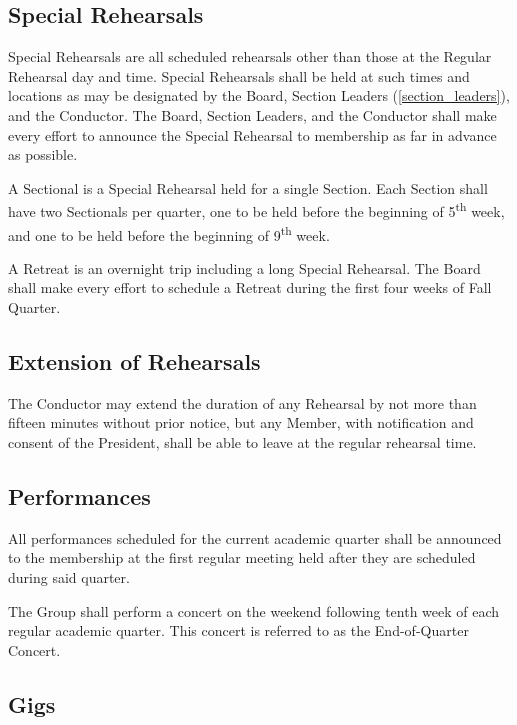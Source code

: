 \documentclass{article}
\begin{document}
\subsection{Special Rehearsals}

Special Rehearsals are all scheduled rehearsals other than those at the Regular
Rehearsal day and time. Special Rehearsals shall be held at such times and
locations as may be designated by the Board, Section Leaders (\ref{section_leaders}),
and the Conductor. The Board, Section Leaders, and the Conductor shall make
every effort to announce the Special Rehearsal to membership as far in advance
as possible.

A Sectional is a Special Rehearsal held for a single Section. Each Section shall
have two Sectionals per quarter, one to be held before the beginning of 5\textsuperscript{th}
week, and one to be held before the beginning of 9\textsuperscript{th} week.

A Retreat is an overnight trip including a long Special Rehearsal. The Board
shall make every effort to schedule a Retreat during the first four weeks of
Fall Quarter.

\subsection{Extension of Rehearsals}

The Conductor may extend the duration of any Rehearsal by not more
than fifteen minutes without prior notice, but any Member, with notification
and consent of the President, shall be able to leave at the regular
rehearsal time.

\subsection{Performances}

All performances scheduled for the current academic quarter shall
be announced to the membership at the first regular meeting held after
they are scheduled during said quarter.

The Group shall perform a concert on the weekend following tenth week of each
regular academic quarter. This concert is referred to as the End-of-Quarter Concert.

\subsection{Gigs}
\end{document}

